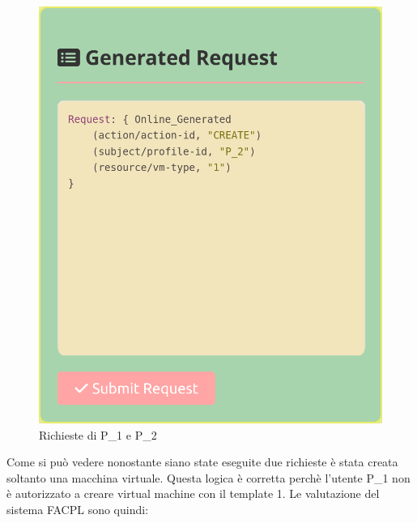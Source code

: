 \begin{figure}[H]
\begin{minipage}{0.49\textwidth}
        \centering
        \includegraphics[width=\textwidth]{tesi_screenshot/P2Create_1.png}
    \end{minipage}
    \caption{Richieste di P\_1 e P\_2}
\end{figure}
Come si può vedere nonostante siano state eseguite due richieste è stata creata soltanto una macchina virtuale. Questa logica è corretta perchè l'utente P\_1 non è autorizzato a creare virtual machine con il template 1. Le valutazione del sistema FACPL sono quindi:
